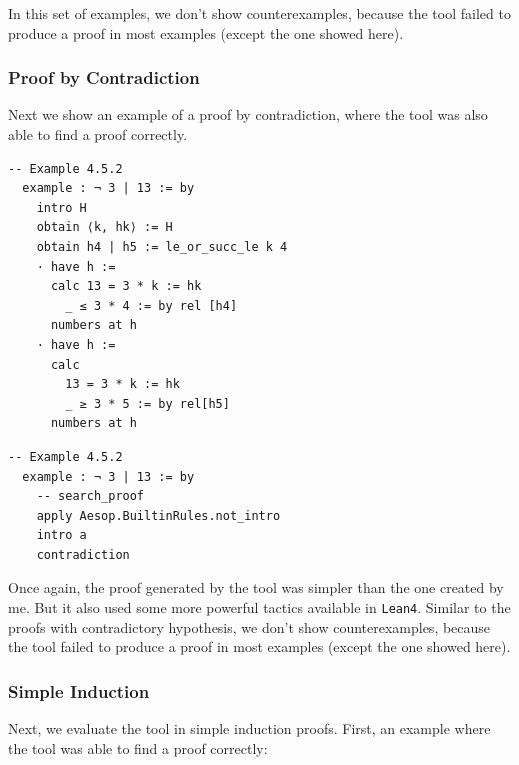\documentclass[12pt]{article}
\newcommand{\leancopilot}{\texttt{LeanCopilot} }
\begin{document}
In this set of examples, we don't show counterexamples, because the tool failed to produce a proof in most examples (except the one showed here).


\subsubsection{Proof by Contradiction}
Next we show an example of a proof by contradiction, where the tool was also able to find a proof correctly. 

\begin{minipage}{0.495\textwidth}
  \begin{lstlisting}[title={Human proof}]
  -- Example 4.5.2
  example : ¬ 3 | 13 := by
    intro H
    obtain ⟨k, hk⟩ := H
    obtain h4 | h5 := le_or_succ_le k 4
    · have h :=
      calc 13 = 3 * k := hk
        _ ≤ 3 * 4 := by rel [h4]
      numbers at h
    · have h :=
      calc
        13 = 3 * k := hk
        _ ≥ 3 * 5 := by rel[h5]
      numbers at h
  \end{lstlisting}
\end{minipage}
\vline
\begin{minipage}{0.495\textwidth}
  \begin{lstlisting}[title={\leancopilot proof}]
  -- Example 4.5.2
  example : ¬ 3 | 13 := by
    -- search_proof
    apply Aesop.BuiltinRules.not_intro
    intro a
    contradiction
  \end{lstlisting}
\end{minipage}

Once again, the proof generated by the tool was simpler than the one created by me. But it also used some more powerful tactics available in \texttt{Lean4}. Similar to the proofs with contradictory hypothesis, we don't show counterexamples, because the tool failed to produce a proof in most examples (except the one showed here).

\subsubsection{Simple Induction}
Next, we evaluate the tool in simple induction proofs. First, an example where the tool was able to find a proof correctly:
\end{document}
